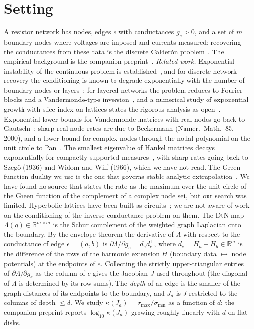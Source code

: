 \documentclass[11pt,a4paper]{article}
\newcommand{\R}{\mathbb{R}}
\begin{document}
\section{Setting}
A resistor network has nodes, edges $e$ with conductances $g_e>0$, and a set of $m$ boundary nodes where voltages are imposed
and currents measured; recovering the conductances from these data is the discrete Calder\'on problem~\cite{Calderon,CurtisMorrow}.
The empirical background is the companion preprint~\cite{Preprint}.
\emph{Related work.} Exponential instability of the continuous problem is established~\cite{DiCristoRondi}, and for discrete network
recovery the conditioning is known to degrade exponentially with the number of boundary nodes or layers~\cite{BorceaReview,BorceaNoise};
for layered networks the problem reduces to Fourier blocks and a Vandermonde-type inversion~\cite{BorceaReview}, and a numerical study
of exponential growth with slice index on lattices states the rigorous analysis as open~\cite{DengJin}. Exponential lower bounds for Vandermonde
matrices with real nodes go back to Gautschi~\cite{Gautschi62,Gautschi75}; sharp real-node rates are due to Beckermann (Numer.\ Math.\ 85, 2000),
and a lower bound for complex nodes through the nodal polynomial on the unit circle to Pan~\cite{Pan}. The smallest eigenvalue of Hankel
matrices decays exponentially for compactly supported measures~\cite{BergSzwarc}, with sharp rates going back to Szeg\H{o} (1936) and
Widom and Wilf (1966), which we have not read. The Green-function duality we use is the one that governs stable analytic extrapolation~\cite{DemanetTownsend}.
We have found no source that states the rate as the maximum over the unit circle of the Green function of the complement of a complex node set,
but our search was limited. Hyperbolic lattices have been built as circuits~\cite{Lenggenhager}; we are not aware of work on the
conditioning of the inverse conductance problem on them. The DtN map $\Lambda(g)\in\R^{m\times m}$ is the Schur complement of the weighted graph Laplacian onto
the boundary. By the envelope theorem the derivative of $\Lambda$ with respect to the conductance of edge $e=(a,b)$ is
$\partial\Lambda/\partial g_e=d_e d_e^{\top}$, where $d_e=H_a-H_b\in\R^m$ is the difference of the rows of the harmonic extension
$H$ (boundary data $\mapsto$ node potentials) at the endpoints of $e$. Collecting the strictly upper-triangular entries of
$\partial\Lambda/\partial g_e$ as the column of $e$ gives the Jacobian $J$ used throughout (the diagonal of $\Lambda$ is
determined by its row sums). The \emph{depth} of an edge is the smaller of the graph distances of its endpoints to the
boundary, and $J_d$ is $J$ restricted to the columns of depth $\le d$. We study $\kappa(J_d)=\sigma_{\max}/\sigma_{\min}$ as a
function of $d$; the companion preprint reports $\log_{10}\kappa(J_d)$ growing roughly linearly with $d$ on flat disks.
\end{document}
